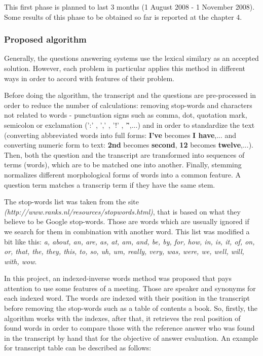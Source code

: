\documentclass[12pt, a4paper]{report}
\begin{document}
This first phase is planned to last 3 months (1 August 2008 - 1 November 2008). Some results of this phase to be obtained so far is reported at the chapter 4. 


\subsubsection{Proposed algorithm}
Generally, the questions answering systems use the lexical similary as an accepted solution. However, each problem in particular applies this method in different ways in order to accord with features of their problem.

Before doing the algorithm, the transcript and the questions are pre-processed in order to reduce the number of calculations: removing stop-words and characters not related to words - punctuation signs such as comma, dot, quotation mark, semicolon or exclamation (':' , ',' , '!' , '\^',...) and in order to standardize the text (converting abbreviated words into full forms: \textbf{I've} becomes \textbf{I have},... and converting numeric form to text: \textbf{2nd} becomes \textbf{second}, \textbf{12} becomes \textbf{twelve},...). Then, both the question and the transcript are transformed into sequences of terms (words), which are to be matched one into another. Finally, stemming normalizes different morphological forms of words into a common feature. A question term matches a transcrip term if they have the same stem.

The stop-words list was taken from the site \emph{(http://www.ranks.nl/resources/stopwords.html)}, that is based on what they believe to be Google stop-words. Those are words which are ussually ignored if we search for them in combination with another word. This list was modified a bit like this: \emph{a, about, an, are, as, at, am, and, be, by, for, how, in, is, it, of, on, or, that, the, they, this, to, so, uh, um, really, very, was, were, we, well, will, with, wow}.

In this project, an indexed-inverse words method was proposed that pays attention to use some features of a meeting. Those are speaker and synonyms for each indexed word. The words are indexed with their position in the transcript before removing the stop-words such as a table of contents a book. So, firstly, the algorithm works with the indexes, after that, it retrieves the real position of found words in order to compare those with the reference answer who was found in the transcript by hand that for the objective of answer evaluation. An example for transcript table can be described as follows:
\end{document}
